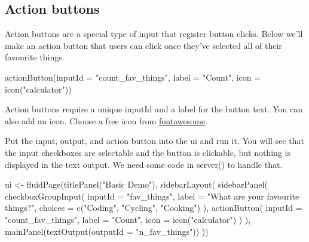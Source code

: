 \documentclass[
]{book}
\newenvironment{Shaded}{\begin{snugshade}}{\end{snugshade}}
\newcommand{\AttributeTok}[1]{\textcolor[rgb]{0.77,0.63,0.00}{#1}}
\newcommand{\FunctionTok}[1]{\textcolor[rgb]{0.00,0.00,0.00}{#1}}
\newcommand{\NormalTok}[1]{#1}
\newcommand{\OtherTok}[1]{\textcolor[rgb]{0.56,0.35,0.01}{#1}}
\newcommand{\StringTok}[1]{\textcolor[rgb]{0.31,0.60,0.02}{#1}}
\begin{document}
\hypertarget{action-buttons}{%
\subsection{Action buttons}\label{action-buttons}}

Action buttons are a special type of input that register button clicks. Below we'll make an action button that users can click once they've selected all of their favourite things.

\begin{Shaded}
\begin{Highlighting}[]
\FunctionTok{actionButton}\NormalTok{(}\AttributeTok{inputId =} \StringTok{"count\_fav\_things"}\NormalTok{,}
             \AttributeTok{label =} \StringTok{"Count"}\NormalTok{,}
             \AttributeTok{icon =} \FunctionTok{icon}\NormalTok{(}\StringTok{"calculator"}\NormalTok{))}
\end{Highlighting}
\end{Shaded}

Action buttons require a unique inputId and a label for the button text. You can also add an icon. Choose a free icon from \href{https://fontawesome.com/icons?d=gallery\&m=free}{fontawesome}.

Put the input, output, and action button into the ui and run it. You will see that the input checkboxes are selectable and the button is clickable, but nothing is displayed in the text output. We need some code in server() to handle that.

\begin{Shaded}
\begin{Highlighting}[]
\NormalTok{ui }\OtherTok{\textless{}{-}} \FunctionTok{fluidPage}\NormalTok{(}\FunctionTok{titlePanel}\NormalTok{(}\StringTok{"Basic Demo"}\NormalTok{),}
                \FunctionTok{sidebarLayout}\NormalTok{(}
                  \FunctionTok{sidebarPanel}\NormalTok{(}
                    \FunctionTok{checkboxGroupInput}\NormalTok{(}
                      \AttributeTok{inputId =} \StringTok{"fav\_things"}\NormalTok{,}
                      \AttributeTok{label =} \StringTok{"What are your favourite things?"}\NormalTok{,}
                      \AttributeTok{choices =} \FunctionTok{c}\NormalTok{(}\StringTok{"Coding"}\NormalTok{, }\StringTok{"Cycling"}\NormalTok{, }\StringTok{"Cooking"}\NormalTok{)}
\NormalTok{                    ),}
                    \FunctionTok{actionButton}\NormalTok{(}
                      \AttributeTok{inputId =} \StringTok{"count\_fav\_things"}\NormalTok{,}
                      \AttributeTok{label =} \StringTok{"Count"}\NormalTok{,}
                      \AttributeTok{icon =} \FunctionTok{icon}\NormalTok{(}\StringTok{"calculator"}\NormalTok{)}
\NormalTok{                    )}
\NormalTok{                  ),}
                  \FunctionTok{mainPanel}\NormalTok{(}\FunctionTok{textOutput}\NormalTok{(}\AttributeTok{outputId =} \StringTok{"n\_fav\_things"}\NormalTok{))}
\NormalTok{                ))}
\end{Highlighting}
\end{Shaded}
\end{document}
